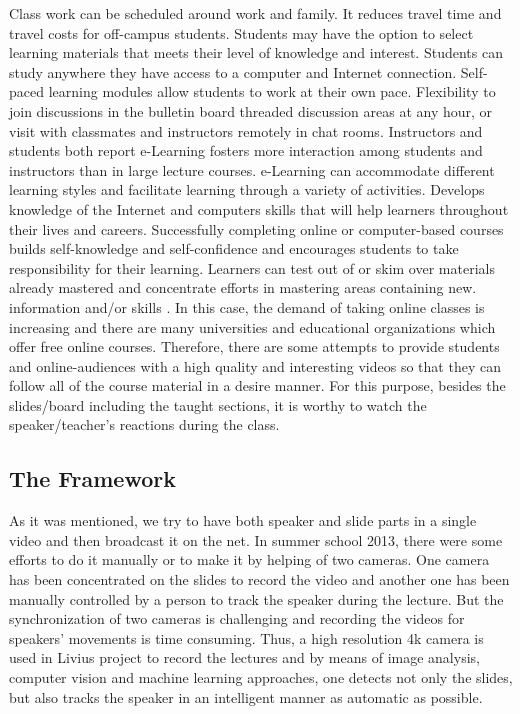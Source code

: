 \documentclass[[12pt,DIV14,BCOR12mm,a4paper,footexclude,headinclude,halfparskip-,twoside,openright,cleardoubleempty,idxtotoc,bibtotoc]{article}
\begin{document}
Class work can be scheduled around work and family.
It reduces travel time and travel costs for off-campus students.
Students may have the option to select learning materials that meets their level of knowledge and interest.
Students can study anywhere they have access to a computer and Internet connection.
Self-paced learning modules allow students to work at their own pace.
Flexibility to join discussions in the bulletin board threaded discussion areas at any hour, or visit with classmates and instructors remotely in chat rooms.
Instructors and students both report e-Learning fosters more interaction among students and instructors than in large lecture courses.
e-Learning can accommodate different learning styles and facilitate learning through a variety of activities. Develops knowledge of the Internet and computers skills that will help learners throughout their lives and careers.
Successfully completing online or computer-based courses builds self-knowledge and self-confidence and encourages students to take responsibility for their learning.
Learners can test out of or skim over materials already mastered and concentrate efforts in mastering areas containing new. information and/or skills \cite{IOWA:Online}.
In this case, the demand of taking online classes is increasing and there are many universities and educational organizations which offer free online courses. Therefore, there are some attempts to provide students and online-audiences with a high quality and interesting videos so that they can follow all of the course material in a desire manner. For this purpose, besides the slides/board including the taught sections, it is worthy to watch the speaker/teacher's reactions during the class.



\subsection{The Framework }

As it was mentioned, we try to have both speaker and slide parts in a single video and then broadcast it on the net. In summer school 2013, there were some efforts to do it manually or to make it by helping of two cameras. One camera has been concentrated on the slides to record the video and another one has been manually controlled by a person to track the speaker during the lecture. But the synchronization of two cameras is challenging and recording the videos for speakers' movements is time consuming. Thus, a high resolution 4k camera is used in Livius project to record the lectures and by means of image analysis, computer vision and machine learning approaches, one detects not only the slides, but also tracks the speaker in an intelligent manner as automatic as possible.
\end{document}
